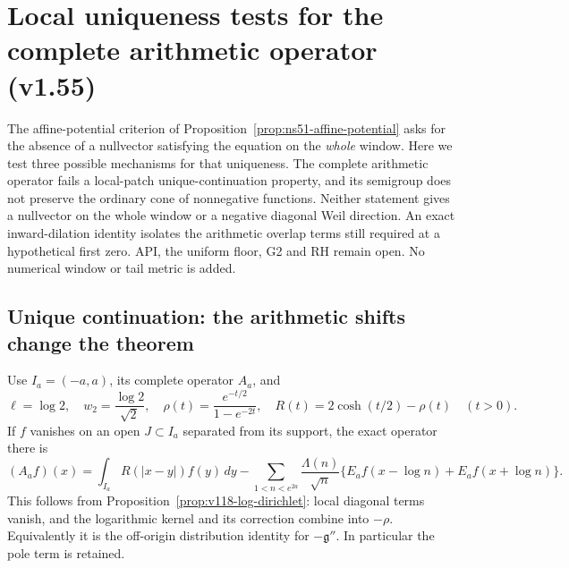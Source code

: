 \section{Local uniqueness tests for the complete arithmetic operator (v1.55)}
\label{sec:v155-local-uniqueness}

The affine-potential criterion of Proposition~\ref{prop:ns51-affine-potential}
asks for the absence of a nullvector satisfying the equation on the
\emph{whole} window. Here we test three possible mechanisms for that
uniqueness. The complete arithmetic operator fails a local-patch
unique-continuation property, and its semigroup does not preserve the
ordinary cone of nonnegative functions. Neither statement gives a
nullvector on the whole window or a negative diagonal Weil direction.
An exact inward-dilation identity isolates the arithmetic overlap
terms still required at a hypothetical first zero. API, the uniform
floor, G2 and RH remain open. No numerical window or tail metric is added.

\subsection*{Unique continuation: the arithmetic shifts change the theorem}

Use $I_a=(-a,a)$, its complete operator $A_a$, and
\[
 \ell=\log2,\quad w_2=\frac{\log2}{\sqrt2},\quad
 \rho(t)=\frac{e^{-t/2}}{1-e^{-2t}},\quad
 R(t)=2\cosh(t/2)-\rho(t)\quad(t>0).
\]
If $f$ vanishes on an open $J\subset I_a$ separated from its support,
the exact operator there is
\begin{equation}\label{eq:ns55-off-support-operator}
 (A_af)(x)=\int_{I_a}R(|x-y|)f(y)\,dy
 -\sum_{1<n<e^{2a}}\frac{\Lambda(n)}{\sqrt n}
       \{E_af(x-\log n)+E_af(x+\log n)\}.
\end{equation}
This follows from Proposition~\ref{prop:v118-log-dirichlet}: local
diagonal terms vanish, and the logarithmic kernel and its correction
combine into $-\rho$. Equivalently it is the off-origin distribution
identity for $-\mathfrak g''$. In particular the pole term is retained.

